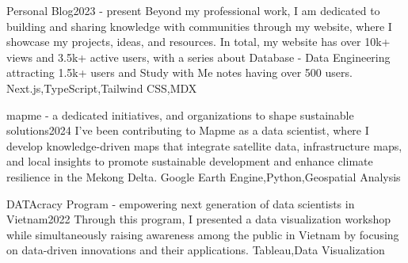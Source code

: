 %
%
%


\begin{projects}
	\project
	{Personal Blog}{2023 - present}
	{\textcolor{RoyalBlue}{ } }
	{Beyond my professional work, I am dedicated to building and sharing knowledge with communities through my website, where I showcase my projects, ideas, and resources. In total, my website has over 10k+ views and 3.5k+ active users, with a series about Database - Data Engineering attracting 1.5k+ users and Study with Me notes having over 500 users.}
	{Next.js,TypeScript,{Tailwind CSS},MDX}
		
	\project
	{mapme - a dedicated initiatives, and organizations to shape sustainable solutions}{2024}
	{}
	{I've been contributing to Mapme as a data scientist, where I develop knowledge-driven maps that integrate satellite data, infrastructure maps, and local insights to promote sustainable development and enhance climate resilience in the Mekong Delta.}
	{Google Earth Engine,Python,Geospatial Analysis}
		
	\project
	{DATAcracy Program - empowering next generation of data scientists in Vietnam}{2022}
	{ }
	{Through this program, I presented a data visualization workshop while simultaneously raising awareness among the public in Vietnam by focusing on data-driven innovations and their applications.}
	{Tableau,Data Visualization}


\end{projects}

